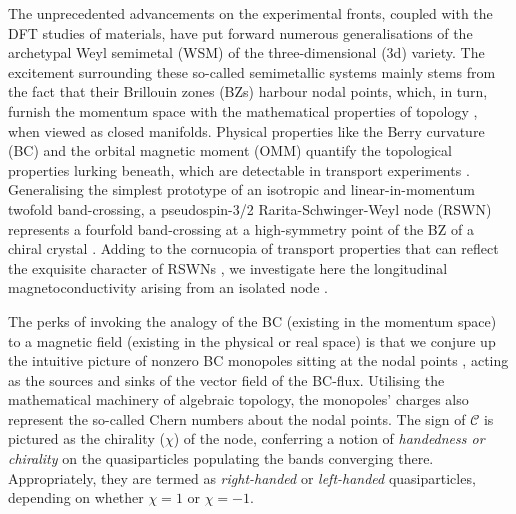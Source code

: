 \documentclass[aps,prb,onecolumn,nofootinbib,citeautoscript,10pt, showkeys]{revtex4-2}
\begin{document}
The unprecedented advancements on the experimental fronts, coupled with the DFT studies of materials, have put forward numerous generalisations of the archetypal Weyl semimetal (WSM) of the three-dimensional (3d) variety\cite{burkov11_Weyl, armitage_review, yan17_topological}. The excitement surrounding these so-called semimetallic systems mainly stems from the fact that their Brillouin zones (BZs) harbour nodal points, which, in turn, furnish the momentum space with the mathematical properties of topology \cite{berry, xiao_review, sundaram99_wavepacket, graf-Nband}, when viewed as closed manifolds. Physical properties like the Berry curvature (BC) and the orbital magnetic moment (OMM) quantify the topological properties lurking beneath, which are detectable in transport experiments \cite{ips_rahul_ph_strain, rahul-jpcm, ips-ruiz, ips-floquet,ips-tilted, claudia-multifold, timm,  li_nmr17, ips-spin1-ph, ips-exact-spin1, ips-nl-ph}. Generalising the simplest prototype of an isotropic and linear-in-momentum twofold band-crossing, a pseudospin-3/2 Rarita-Schwinger-Weyl node (RSWN)~\cite{bernevig, long, igor, igor2, isobe-fu, tang2017_multiple, ips3by2, ips-jns, ips-cd1,ips_cd, ma2021_observation, ips-magnus, ips_jj_rsw} represents a fourfold band-crossing at a high-symmetry point of the BZ of a chiral crystal \cite{bernevig, chang2018, grushin-multifold}. Adding to the cornucopia of transport properties that can reflect the exquisite character of RSWNs \cite{ips-magnus, ips-cd1, ips-jns, ips_jj_rsw, ips-rsw-ph, ips-shreya, ips-internode}, we investigate here the longitudinal magnetoconductivity arising from an isolated node \cite{ips-exact-kwn}.


The perks of invoking the analogy of the BC (existing in the momentum space) to a magnetic field (existing in the physical or real space) is that we conjure up the intuitive picture of nonzero BC monopoles sitting at the nodal points \cite{fuchs-review, polash-review}, acting as the sources and sinks of the vector field of the BC-flux. Utilising the mathematical machinery of algebraic topology, the monopoles' charges also represent the so-called Chern numbers about the nodal points. The sign of $\mathcal C$ is pictured as the chirality ($\chi$) of the node, conferring a notion of \textit{handedness or chirality} on the quasiparticles populating the bands converging there. Appropriately, they are termed as \textit{right-handed} or \textit{left-handed} quasiparticles, depending on whether $\chi = 1$ or $\chi = -1$.

 
\end{document}
